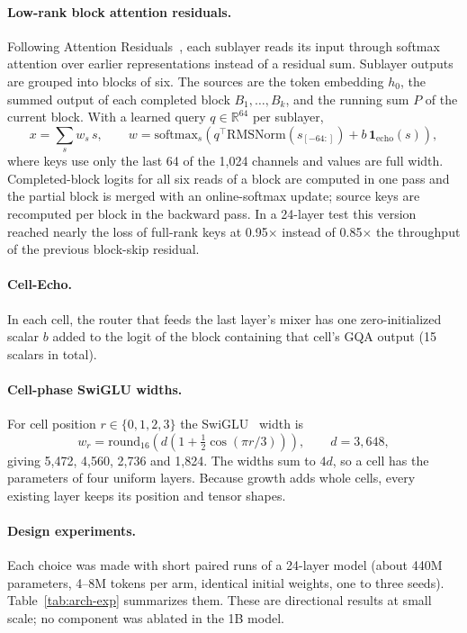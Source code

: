 \documentclass[11pt]{article}
\begin{document}
\paragraph{Low-rank block attention residuals.} Following Attention Residuals~\cite{attnres2026}, each sublayer
reads its input through softmax attention over earlier representations instead of a residual sum. Sublayer
outputs are grouped into blocks of six. The sources are the token embedding $h_0$, the summed output of each
completed block $B_1,\dots,B_k$, and the running sum $P$ of the current block. With a learned query
$q\in\mathbb{R}^{64}$ per sublayer,
\begin{equation}
x = \sum_{s} w_s\, s,\qquad w=\mathrm{softmax}_s\!\left(q^{\top}\mathrm{RMSNorm}(s_{[-64:]}) + b\,\mathbf{1}_{\mathrm{echo}}(s)\right),
\end{equation}
where keys use only the last 64 of the 1,024 channels and values are full width. Completed-block logits for all
six reads of a block are computed in one pass and the partial block is merged with an online-softmax update;
source keys are recomputed per block in the backward pass. In a 24-layer test this version reached nearly the
loss of full-rank keys at 0.95$\times$ instead of 0.85$\times$ the throughput of the previous block-skip
residual.

\paragraph{Cell-Echo.} In each cell, the router that feeds the last layer's mixer has one zero-initialized
scalar $b$ added to the logit of the block containing that cell's GQA output (15 scalars in total).

\paragraph{Cell-phase SwiGLU widths.} For cell position $r\in\{0,1,2,3\}$ the SwiGLU~\cite{swiglu2020} width is
\begin{equation}
w_r=\mathrm{round}_{16}\!\left(d\left(1+\tfrac12\cos(\pi r/3)\right)\right),\qquad d=3{,}648,
\end{equation} giving 5,472, 4,560, 2,736 and 1,824. The
widths sum to $4d$, so a cell has the parameters of four uniform layers. Because growth adds whole cells,
every existing layer keeps its position and tensor shapes.

\paragraph{Design experiments.} Each choice was made with short paired runs of a 24-layer model (about 440M
parameters, 4--8M tokens per arm, identical initial weights, one to three seeds). Table~\ref{tab:arch-exp}
summarizes them. These are directional results at small scale; no component was ablated in the 1B model.
\end{document}
